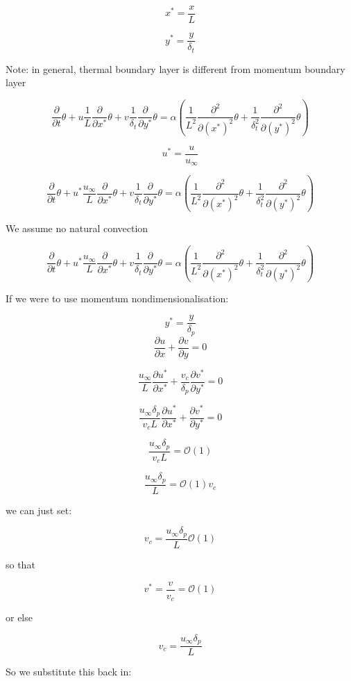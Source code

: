 \documentclass[11pt]{article}
\begin{document}
$$x^* = \frac{x}{L}$$

$$y^* = \frac{y}{\delta_t}$$

Note: in general, thermal boundary layer is different from momentum boundary layer


$$\frac{\partial }{\partial t} \theta + u \frac{1}{L} \frac{\partial}{\partial x^*} \theta + v \frac{1}{\delta_t} \frac{\partial }{\partial y^*} \theta   = \alpha ( \frac{1}{L^2} \frac{\partial^2}{\partial (x^*)^2} \theta  +  \frac{1}{\delta_t^2} \frac{\partial^2 }{\partial (y^*)^2} \theta ) $$ 

$$u^* = \frac{u}{u_\infty}$$


$$\frac{\partial }{\partial t} \theta + u^* \frac{u_\infty}{L} \frac{\partial}{\partial x^*} \theta + v \frac{1}{\delta_t} \frac{\partial }{\partial y^*} \theta   = \alpha ( \frac{1}{L^2} \frac{\partial^2}{\partial (x^*)^2} \theta  +  \frac{1}{\delta_t^2} \frac{\partial^2 }{\partial (y^*)^2} \theta ) $$ 

We assume no natural convection

$$\frac{\partial }{\partial t} \theta + u^* \frac{u_\infty}{L} \frac{\partial}{\partial x^*} \theta + v \frac{1}{\delta_t} \frac{\partial }{\partial y^*} \theta   = \alpha ( \frac{1}{L^2} \frac{\partial^2}{\partial (x^*)^2} \theta  +  \frac{1}{\delta_t^2} \frac{\partial^2 }{\partial (y^*)^2} \theta ) $$ 

If we were to use momentum nondimensionalisation:

$$y^* = \frac{y}{\delta_p}$$
$$\frac{\partial u}{\partial x} + \frac{\partial v}{\partial y} = 0$$

$$ \frac{u_\infty}{L} \frac{\partial u^*}{\partial x^*} + \frac{v_c}{\delta_p} \frac{\partial v^*}{\partial y^*} = 0$$

$$ \frac{u_\infty \delta_p}{v_c L} \frac{\partial u^*}{\partial x^*} +  \frac{\partial v^*}{\partial y^*} = 0$$

$$\frac{u_\infty \delta_p}{v_c L} = \mathcal{O}(1)$$

$$\frac{u_\infty \delta_p}{L} = \mathcal{O}(1) v_c$$

we can just set:

$$v_c = \frac{u_\infty \delta_p}{L}\mathcal{O}(1)$$

so that

$$v^* = \frac{v}{v_c} = \mathcal{O}(1)$$

or else

$$v_c = \frac{u_\infty \delta_p}{L}$$

So we substitute this back in:
\end{document}
